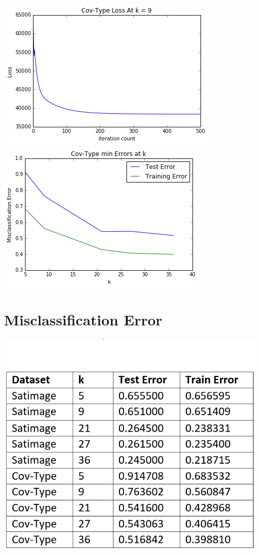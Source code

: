 \documentclass[letter]{article} %
\begin{document}
\includegraphics[scale=1]{cov_loss} \\
\includegraphics[scale=1]{cov_err}


\section*{Misclassification Error}

\includegraphics[scale=1]{table}
\end{document}

